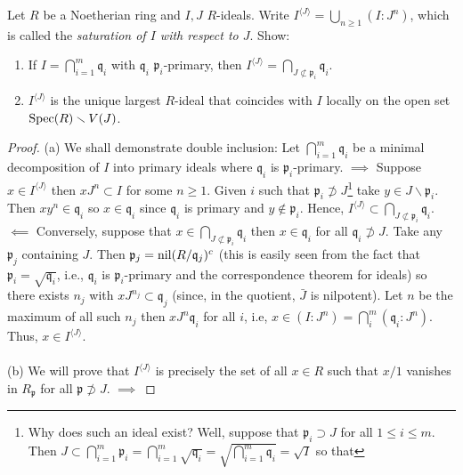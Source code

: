 \begin{problem}
Let $R$ be a Noetherian ring and $I,J$ $R$-ideals. Write
$I^{\langle  J \rangle}=\bigcup_{n\geq 1}(I:J^n)$, which is
called the \emph{saturation of $I$ with respect to $J$}. Show:
\begin{enumerate}[label=(\alph*)]
\item If $I=\bigcap_{i=1}^m\mathfrak{q}_i$ with $\mathfrak{q}_i$
  $\mathfrak{p}_i$-primary, then $I^{\langle
    J\rangle}=\bigcap_{J\nsubset\mathfrak{p}_i}\mathfrak{q}_i$.
\item $I^{\langle  J \rangle}$ is the unique largest $R$-ideal
  that coincides with $I$ locally on the open set
  $\operatorname{Spec}(R)\smallsetminus V(J)$.
\end{enumerate}
\end{problem}
\begin{proof}
(a) We shall demonstrate double inclusion: Let
$\bigcap_{i=1}^m\mathfrak{q}_i$ be a minimal decomposition of $I$ into
primary ideals where $\mathfrak{q}_i$ is
$\mathfrak{p}_i$-primary. $\implies$ Suppose $x\in I^{\langle J\rangle}$
then $xJ^n\subset I$ for some $n\geq 1$. Given $i$ such that
$\mathfrak{p}_i\nsupset J$\footnote{Why does such an ideal exist? Well,
  suppose that $\mathfrak{p}_i\supset J$ for all $1\leq i\leq
  m$. Then
  $J\subset\bigcap_{i=1}^m\mathfrak{p}_i=\bigcap_{i=1}^m\sqrt{\mathfrak{q}_i}=\sqrt{\bigcap_{i=1}^m\mathfrak{q}_i}=\sqrt{I}$
so that }
take $y\in
J\smallsetminus\mathfrak{p}_i$. Then $xy^n\in\mathfrak{q}_i$ so
$x\in\mathfrak{q}_i$ since $\mathfrak{q}_i$ is primary and
$y\notin\mathfrak{p}_i$. Hence, $I^{\langle
  J\rangle}\subset\bigcap_{J\nsubset\mathfrak{p}_i}\mathfrak{q}_i$. $\impliedby$
Conversely, suppose that
$x\in\bigcap_{J\nsubset\mathfrak{p}_i}\mathfrak{q}_i$ then
$x\in\mathfrak{q}_i$ for all $\mathfrak{q}_i\nsupset J$. Take any
$\mathfrak{p}_j$ containing $J$. Then
$\mathfrak{p}_j=\operatorname{nil}(R/\mathfrak{q}_j)^c$ (this is easily seen
from the fact that $\mathfrak{p}_i=\sqrt{\mathfrak{q}_i}$, i.e.,
$\mathfrak{q}_i$ is $\mathfrak{p}_i$-primary and the
correspondence theorem for ideals) so there exists $n_j$ with
$xJ^{n_j}\subset\mathfrak{q}_j$ (since, in the quotient, $\bar J$
is nilpotent). Let $n$ be the maximum of all such $n_j$ then
$xJ^n\mathfrak{q}_i$ for all $i$, i.e,
$x\in(I:J^n)=\bigcap_{i}^m(\mathfrak{q}_i:J^n)$. Thus, $x\in
I^{\langle  J \rangle}$.
\\\\
(b) We will prove that $I^{\langle  J\rangle}$ is precisely the
set of all $x\in R$ such that $x/1$ vanishes in
$R_{\mathfrak{p}}$ for all $\mathfrak{p}\nsupset J$. $\implies$

\end{proof}
